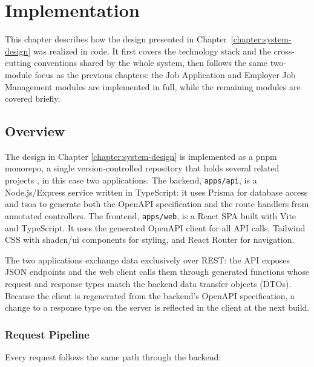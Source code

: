 
\chapter{Implementation}
\label{chapter:implementation}

This chapter describes how the design presented in Chapter~\ref{chapter:system-design} was realized in code. It first covers the technology stack and the cross-cutting conventions shared by the whole system, then follows the same two-module focus as the previous chapters: the Job Application and Employer Job Management modules are implemented in full, while the remaining modules are covered briefly.

\section{Overview}

The design in Chapter \ref{chapter:system-design} is implemented as a pnpm \cite{pnpm_docs} monorepo, a single version-controlled repository that holds several related projects \cite{potvin2016monorepo}, in this case two applications. The backend, \texttt{apps/api}, is a Node.js/Express service written in TypeScript: it uses Prisma for database access and tsoa \cite{tsoa_docs} to generate both the OpenAPI \cite{openapi_spec} specification and the route handlers from annotated controllers. The frontend, \texttt{apps/web}, is a React SPA built with Vite \cite{vite_docs} and TypeScript. It uses the generated OpenAPI client for all API calls, Tailwind CSS with shadcn/ui components for styling, and React Router \cite{reactrouter_docs} for navigation.

The two applications exchange data exclusively over REST: the API exposes JSON endpoints and the web client calls them through generated functions whose request and response types match the backend data transfer objects (DTOs). Because the client is regenerated from the backend's OpenAPI specification, a change to a response type on the server is reflected in the client at the next build.

\subsection{Request Pipeline}

Every request follows the same path through the backend:

